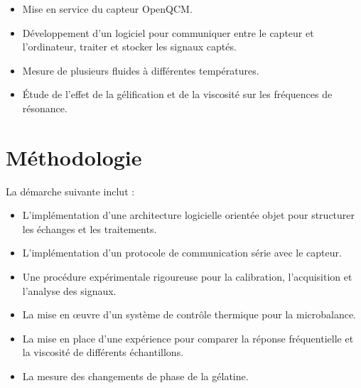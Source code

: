 \begin{itemize}[label=\textbullet]
    \item Mise en service du capteur OpenQCM.
    \item Développement d'un logiciel pour communiquer entre le capteur et l'ordinateur, traiter et stocker les signaux captés.
    \item Mesure de plusieurs fluides à différentes températures.
    \item Étude de l'effet de la gélification et de la viscosité sur les fréquences de résonance.
\end{itemize}

\section{Méthodologie}

La démarche suivante inclut :
\begin{itemize}[label=\textbullet]
    \item L’implémentation d’une architecture logicielle orientée objet pour structurer les échanges et les traitements.
    \item L’implémentation d’un protocole de communication série avec le capteur.
    \item Une procédure expérimentale rigoureuse pour la calibration, l'acquisition et l’analyse des signaux.
    \item La mise en œuvre d’un système de contrôle thermique pour la microbalance.
    \item La mise en place d'une expérience pour comparer la réponse fréquentielle et la viscosité de différents échantillons.
    \item La mesure des changements de phase de la gélatine.
\end{itemize}






